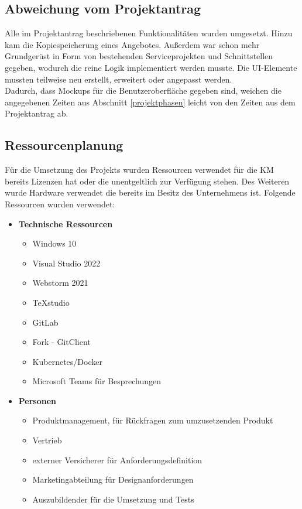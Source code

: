 {\subsection{Abweichung vom Projektantrag}
\label{abweichung}
Alle im Projektantrag beschriebenen Funktionalitäten wurden umgesetzt. Hinzu kam die Kopiespeicherung eines Angebotes. Außerdem war schon mehr Grundgerüst in Form von bestehenden Serviceprojekten und Schnittstellen gegeben, wodurch die reine Logik implementiert werden musste. Die UI-Elemente mussten teilweise neu erstellt, erweitert oder angepasst werden.\\
Dadurch, dass Mockups für die Benutzeroberfläche gegeben sind, weichen die angegebenen Zeiten aus Abschnitt \ref{projektphasen} leicht von den Zeiten aus dem Projektantrag ab.
\subsection{Ressourcenplanung}
\label{ressourcenplanung}
Für die Umsetzung des Projekts wurden Ressourcen verwendet für die \ac{KM} bereits Lizenzen hat oder die unentgeltlich zur Verfügung stehen. Des Weiteren wurde Hardware verwendet die bereits im Besitz des Unternehmens ist.
Folgende Ressourcen wurden verwendet:

\begin{itemize}
	\item \textbf{Technische Ressourcen}
	\begin{itemize}
		\item Windows 10
		\item Visual Studio 2022
		\item Webstorm 2021
		\item TeXstudio
		\item GitLab
		\item Fork - GitClient
		\item Kubernetes/Docker
		\item Microsoft Teams für Besprechungen
	\end{itemize}
	\item \textbf{Personen}
	\begin{itemize}
	 	\item Produktmanagement, für Rückfragen zum umzusetzenden Produkt
	 	\item Vertrieb
	 	\item externer Versicherer für Anforderungsdefinition
		\item Marketingabteilung für Designanforderungen
		\item Auszubildender für die Umsetzung und Tests
	\end{itemize}
\end{itemize}

}
